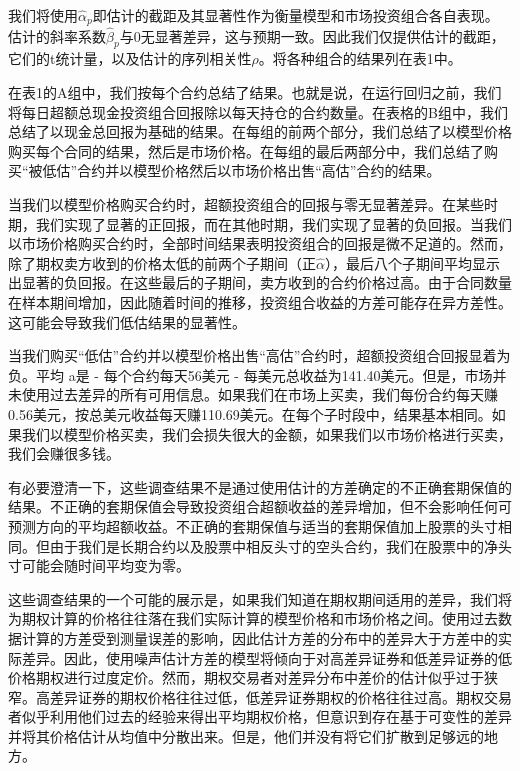 \par{
    我们将使用$\hat{\alpha}_p$即估计的截距及其显著性作为衡量模型和市场投资组合各自表现。 估计的斜率系数$\hat{\beta}_p$与0无显著差异，这与预期一致。因此我们仅提供估计的截距，它们的t统计量，以及估计的序列相关性$\rho$。将各种组合的结果列在表1中。
}
\par{
    在表1的A组中，我们按每个合约总结了结果。也就是说，在运行回归之前，我们将每日超额总现金投资组合回报除以每天持仓的合约数量。在表格的B组中，我们总结了以现金总回报为基础的结果。在每组的前两个部分，我们总结了以模型价格购买每个合同的结果，然后是市场价格。在每组的最后两部分中，我们总结了购买“被低估”合约并以模型价格然后以市场价格出售“高估”合约的结果。
}
\par{
    当我们以模型价格购买合约时，超额投资组合的回报与零无显著差异。在某些时期，我们实现了显著的正回报，而在其他时期，我们实现了显著的负回报。当我们以市场价格购买合约时，全部时间结果表明投资组合的回报是微不足道的。然而，除了期权卖方收到的价格太低的前两个子期间（正$\hat{\alpha}$），最后八个子期间平均显示出显著的负回报。在这些最后的子期间，卖方收到的合约价格过高。由于合同数量在样本期间增加，因此随着时间的推移，投资组合收益的方差可能存在异方差性。这可能会导致我们低估结果的显著性。
}
\par{
    当我们购买“低估”合约并以模型价格出售“高估”合约时，超额投资组合回报显着为负。平均 a是 - 每个合约每天56美元 - 每美元总收益为141.40美元。但是，市场并未使用过去差异的所有可用信息。如果我们在市场上买卖，我们每份合约每天赚0.56美元，按总美元收益每天赚110.69美元。在每个子时段中，结果基本相同。如果我们以模型价格买卖，我们会损失很大的金额，如果我们以市场价格进行买卖，我们会赚很多钱。
}
\par{
    有必要澄清一下，这些调查结果不是通过使用估计的方差确定的不正确套期保值的结果。不正确的套期保值会导致投资组合超额收益的差异增加，但不会影响任何可预测方向的平均超额收益。不正确的套期保值与适当的套期保值加上股票的头寸相同。但由于我们是长期合约以及股票中相反头寸的空头合约，我们在股票中的净头寸可能会随时间平均变为零。
}
\par{这些调查结果的一个可能的展示是，如果我们知道在期权期间适用的差异，我们将为期权计算的价格往往落在我们实际计算的模型价格和市场价格之间。使用过去数据计算的方差受到测量误差的影响，因此估计方差的分布中的差异大于方差中的实际差异。因此，使用噪声估计方差的模型将倾向于对高差异证券和低差异证券的低价格期权进行过度定价。然而，期权交易者对差异分布中差价的估计似乎过于狭窄。高差异证券的期权价格往往过低，低差异证券期权的价格往往过高。期权交易者似乎利用他们过去的经验来得出平均期权价格，但意识到存在基于可变性的差异并将其价格估计从均值中分散出来。但是，他们并没有将它们扩散到足够远的地方。}